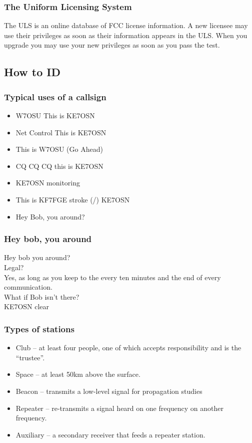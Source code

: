 \documentclass[10pt, handout]{beamer}
\begin{document}
\begin{frame}
\frametitle{The Uniform Licensing System}
The ULS is an online database of FCC license information. A new licensee may use their privileges as soon as their information appears in the ULS. When you upgrade you may use your new privileges as soon as you pass the test.
\end{frame}

\subsection{How to ID}

\begin{frame}
\frametitle{Typical uses of a callsign}
\begin{itemize}[<+->]
\item W7OSU This is KE7OSN
\item Net Control This is KE7OSN
\item This is W7OSU (Go Ahead)
\item CQ CQ CQ this is KE7OSN
\item KE7OSN monitoring
\item This is KF7FGE stroke (/) KE7OSN
\item Hey Bob, you around?
\end{itemize}
\end{frame}

\begin{frame}
\frametitle{Hey bob, you around}
Hey bob you around?\\
Legal? \\ \pause
Yes, as long as you keep to the every ten minutes and the end of every communication. \\ \pause
What if Bob isn't there? \\ \pause
KE7OSN clear
\end{frame}

\begin{frame}
\frametitle{Types of stations}
\begin{itemize}
\item Club – at least four  people, one of which accepts responsibility and is the “trustee”.
\item Space – at least 50km above the surface.
\item Beacon --  transmits a low-level signal for propagation studies
\item Repeater – re-transmits  a signal heard on one frequency on another frequency.
\item Auxiliary – a secondary receiver that feeds a repeater station.  
\end{itemize}
\end{frame}
\end{document}
